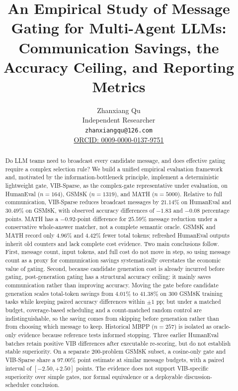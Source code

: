 \documentclass[11pt,twoside,twocolumn,letterpaper]{article}
\title{An Empirical Study of Message Gating for Multi-Agent LLMs:\\Communication Savings, the Accuracy Ceiling, and Reporting Metrics}
\author{Zhanxiang Qu\\Independent Researcher\\\texttt{zhanxiangqu@126.com}\\
  \href{https://orcid.org/0009-0000-0137-9751}{ORCID: 0009-0000-0137-9751}}
\date{}
\begin{document}
\maketitle
\thispagestyle{plain}
\pagestyle{plain}

\begin{abstract}
Do LLM teams need to broadcast every candidate message, and does effective gating require a complex selection rule? We build a unified empirical evaluation framework and, motivated by the information-bottleneck principle, implement a deterministic lightweight gate, VIB-Sparse, as the complex-gate representative under evaluation, on HumanEval ($n=164$), GSM8K ($n=1319$), and MATH ($n=5000$). Relative to full communication, VIB-Sparse reduces broadcast messages by $21.14\%$ on HumanEval and $30.49\%$ on GSM8K, with observed accuracy differences of $-1.83$ and $-0.08$ percentage points. MATH has a $-0.92$-point difference for $25.59\%$ message reduction under a conservative whole-answer matcher, not a complete semantic oracle. GSM8K and MATH record only $4.96\%$ and $4.42\%$ fewer total tokens; refreshed HumanEval outputs inherit old counters and lack complete cost evidence. Two main conclusions follow. First, message count, input tokens, and full cost do not move in step, so using message count as a proxy for communication savings systematically overstates the economic value of gating. Second, because candidate generation cost is already incurred before gating, post-generation gating has a structural accuracy ceiling: it mainly saves communication rather than improving accuracy. Moving the gate before candidate generation scales total-token savings from $4.01\%$ to $41.38\%$ on $300$ GSM8K training tasks while keeping paired accuracy differences within $\pm1$ pp; but under a matched budget, coverage-based scheduling and a count-matched random control are indistinguishable, so the saving comes from skipping before generation rather than from choosing which message to keep. Historical MBPP ($n=257$) is isolated as oracle-only evidence because reference tests informed stopping. Three earlier HumanEval batches retain positive VIB differences after executable re-scoring, but do not establish stable superiority. On a separate $200$-problem GSM8K subset, a cosine-only gate and VIB-Sparse share a $97.00\%$ point estimate at similar message budgets, with a paired interval of $[-2.50,+2.50]$ points. The evidence does not support VIB-specific superiority over simple gates, nor formal equivalence or a deployable discussion-scheduler conclusion.
\end{abstract}
\end{document}
